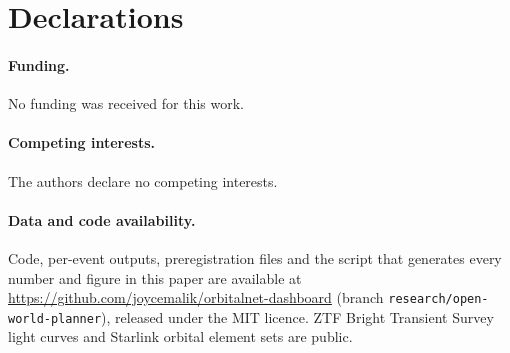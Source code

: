 
\section*{Declarations}
\paragraph{Funding.} No funding was received for this work.
\paragraph{Competing interests.} The authors declare no competing interests.
\paragraph{Data and code availability.} Code, per-event outputs, preregistration files and the script that generates every number and figure in this paper are available at \url{https://github.com/joycemalik/orbitalnet-dashboard} (branch \texttt{research/open-world-planner}), released under the MIT licence. ZTF Bright Transient Survey light curves and Starlink orbital element sets are public.
